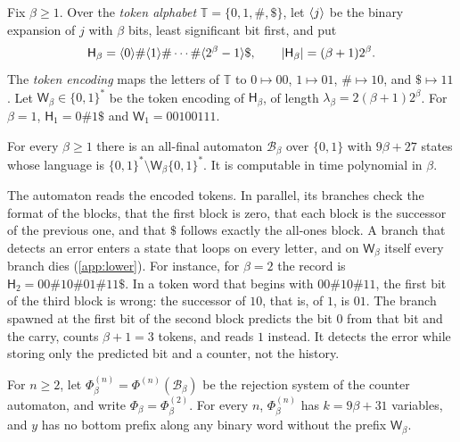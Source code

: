 Fix $\beta\ge1$. Over the \emph{token alphabet} $\mathbb T=\{0,1,\#,\$\}$,
let $\langle j\rangle$ be the binary expansion of $j$ with $\beta$ bits, least
significant bit first, and put
\[
 \mathsf H_\beta=\langle 0\rangle\#\langle 1\rangle\#\cdots\#\langle 2^\beta-1\rangle\$,
 \qquad \lvert \mathsf H_\beta\rvert=(\beta+1)2^\beta.
\]
The \emph{token encoding} maps the letters of $\mathbb T$ to $0\mapsto00$,
$1\mapsto01$, $\#\mapsto10$, and $\$\mapsto11$. Let
$\mathsf W_\beta\in\{0,1\}^*$ be the token encoding of $\mathsf H_\beta$, of
length $\lambda_\beta=2(\beta+1)2^\beta$. For $\beta=1$,
$\mathsf H_1=0\#1\$$ and $\mathsf W_1=00100111$.

\begin{lemma}\label{lem:cx-counter}
For every $\beta\ge1$ there is an all-final automaton $\mathcal B_\beta$
over $\{0,1\}$ with $9\beta+27$ states whose language is
$\{0,1\}^*\setminus\mathsf W_\beta\{0,1\}^*$. It is computable in time
polynomial in $\beta$.
\end{lemma}

The automaton reads the encoded tokens. In parallel, its branches check the
format of the blocks, that the first block is zero, that each block is the
successor of the previous one, and that $\$$ follows exactly the all-ones
block. A branch that detects an error enters a state that loops on every
letter, and on $\mathsf W_\beta$ itself every branch dies (\cref{app:lower}).
For instance, for $\beta=2$ the record is $\mathsf H_2=00\#10\#01\#11\$$. In a
token word that begins with $00\#10\#11$, the first bit of the third block is
wrong: the successor of $10$, that is, of $1$, is $01$. The branch spawned at
the first bit of the second block predicts the bit $0$ from that bit and the
carry, counts $\beta+1=3$ tokens, and reads $1$ instead. It detects the
error while storing only the predicted bit and a counter, not the history.

For $n\ge2$, let $\Phi_\beta^{(n)}=\Phi^{(n)}(\mathcal B_\beta)$ be the
rejection system of the counter automaton, and write
$\Phi_\beta=\Phi_\beta^{(2)}$. For every $n$, $\Phi_\beta^{(n)}$ has
$k=9\beta+31$ variables, and $y$ has no bottom prefix along any binary word
without the prefix $\mathsf W_\beta$.

